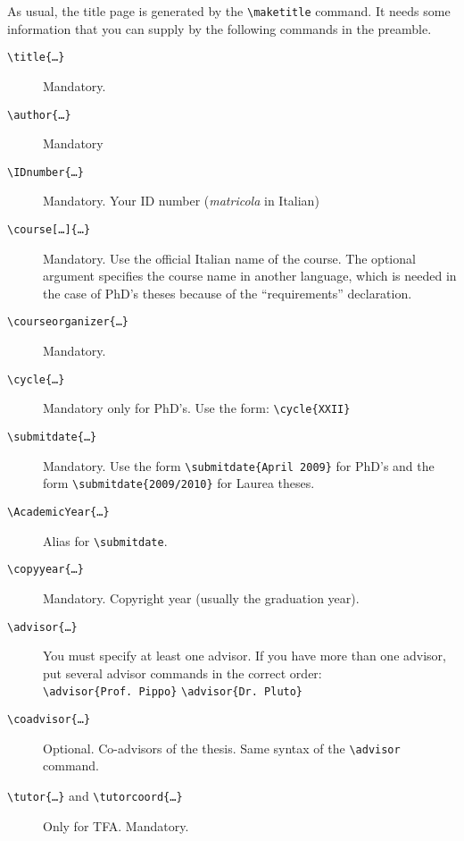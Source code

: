 \documentclass[a5paper,11pt]{article}
\newcommand{\bs}{\textbackslash}
\begin{document}
As usual, the title page is generated by the \texttt{\bs maketitle} command.
It needs some information that you can supply by the following commands
in the preamble.
\begin{description}
\item[\texttt{\bs title\{\dots\}}] Mandatory.

\item[\texttt{\bs author\{\dots\}}] Mandatory

\item[\texttt{\bs IDnumber\{\dots\}}] Mandatory. Your ID number (\textit{matricola} in Italian)

\item[\texttt{\bs course[\dots]\{\dots\}}] Mandatory. Use the official Italian name of the course. The optional argument specifies the course name in another language, which is needed in the case of PhD's theses because of the ``requirements'' declaration.

\item[\texttt{\bs courseorganizer\{\dots\}}] Mandatory.

\item[\texttt{\bs cycle\{\dots\}}] Mandatory only for PhD's. Use the form: \texttt{\bs cycle\{XXII\}}

\item[\texttt{\bs submitdate\{\dots\}}] Mandatory. Use the form \texttt{\bs submitdate\{April 2009\}} for PhD's and the form \texttt{\bs submitdate\{2009/2010\}} for Laurea theses.

\item[\texttt{\bs AcademicYear\{\dots\}}] Alias for \texttt{\bs submitdate}.

\item[\texttt{\bs copyyear\{\dots\}}] Mandatory. Copyright year (usually the 
graduation year). 

\item[\texttt{\bs advisor\{\dots\}}] You must specify at least one advisor.
If you have more than one advisor, put several advisor commands in the correct order:\\
\texttt{\bs advisor\{Prof.~Pippo\}} \texttt{\bs advisor\{Dr.~Pluto\}}

\item[\texttt{\bs coadvisor\{\dots\}}] Optional. Co-advisors of the thesis. 
Same syntax of the \texttt{\bs advisor} command. 

\item[\texttt{\bs tutor\{\dots\}} and \texttt{\bs tutorcoord\{\dots\}}] Only for TFA. Mandatory.


\end{description}
\end{document}
